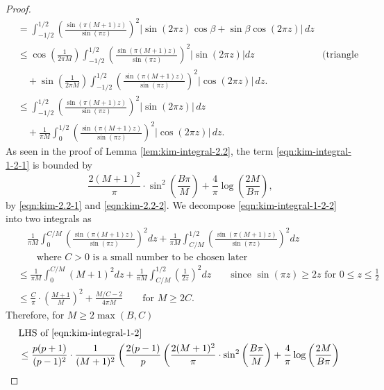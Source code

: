 \documentclass[11pt,letterpaper,reqno]{amsart}
\theoremstyle{definition}
\numberwithin{equation}{section}
\numberwithin{figure}{section}
\numberwithin{table}{section}
\begin{document}
\begin{proof}
\begin{align}
 &= \int_{-1/2}^{1/2} \left( \frac{\sin \left( \pi (M + 1) z \right)}{\sin \left( \pi z \right)} \right)^2  |\sin(2\pi z)\cos\beta + \sin \beta \cos(2\pi z) |  \,dz\\
 &\leq \cos\left( \frac{1}{2\pi M} \right) \int_{-1/2}^{1/2} \left( \frac{\sin \left( \pi (M + 1) z \right)}{\sin \left( \pi z \right)} \right)^2  |\sin(2\pi z) |  dz & \text{(triangle inequality)} \\
 &\quad   + \sin\left( \frac{1}{2\pi M} \right)\int_{-1/2}^{1/2} \left( \frac{\sin \left( \pi (M + 1) z \right)}{\sin \left( \pi z \right)} \right)^2  | \cos(2\pi z) | \, dz.\\
 &\leq \int_{-1/2}^{1/2} \left( \frac{\sin \left( \pi (M + 1) z \right)}{\sin \left( \pi z \right)} \right)^2  |\sin(2\pi z) | \, dz \label{eqn:kim-integral-1-2-1}\\
 &\quad   + \frac{1}{\pi M} \int_{0}^{1/2} \left( \frac{\sin \left( \pi (M + 1) z \right)}{\sin \left( \pi z \right)} \right)^2  | \cos(2\pi z) | \, dz. \label{eqn:kim-integral-1-2-2}
\end{align}
As seen in the proof of Lemma \ref{lem:kim-integral-2.2}, the term \eqref{eqn:kim-integral-1-2-1} is bounded by
$$\frac{2(M + 1)^2}{\pi} \cdot \sin^2\left(\frac{B\pi}{M} \right) + \frac{4}{\pi} \log \left( \frac{2M}{B\pi} \right),$$
by \eqref{eqn:kim-2.2-1} and \eqref{eqn:kim-2.2-2}. We decompose \eqref{eqn:kim-integral-1-2-2} into two integrals as
\begin{align}
    & \quad \frac{1}{\pi M} \int_{0}^{C/M} \left( \frac{\sin \left( \pi (M + 1) z \right)}{\sin \left( \pi z \right)} \right)^2 dz + \frac{1}{\pi M} \int_{C/M}^{1/2} \left( \frac{\sin \left( \pi (M + 1) z \right)}{\sin \left( \pi z \right)} \right)^2 dz\\
    & \qquad \text{where $C > 0$ is a small number to be chosen later}\\
    &\leq \frac{1}{\pi M} \int_{0}^{C/M} (M + 1)^2 dz + \frac{1}{\pi M} \int_{C/M}^{1/2} \left( \frac{1}{2z } \right)^2 dz \qquad \text{since $\sin(\pi z) \geq 2z$ for $0 \leq z \leq \frac{1}{2}$}\\
    &\leq \frac{C}{\pi} \cdot \left( \frac{M + 1}{M} \right)^2 + \frac{M/C - 2}{4 \pi M} \qquad \text{for $M \geq 2C.$}
\end{align}
Therefore, for $M \geq 2 \max(B, C)$
\begin{align}
    &\text{LHS of \eqref{eqn:kim-integral-1-2}}\\
    &\leq \frac{p(p + 1)}{(p - 1)^2} \cdot \frac{1}{(M + 1)^2} \left( \frac{2(p - 1)}{p} \left(\frac{2(M + 1)^2}{\pi} \cdot \sin^2\left(\frac{B\pi}{M} \right) + \frac{4}{\pi} \log \left( \frac{2M}{B\pi} \right)   \right. \right. \\

\end{align}
\end{proof}
\end{document}
